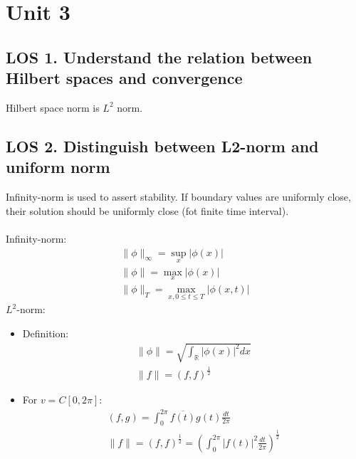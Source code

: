 \documentclass[12pt, a4paper]{article}
\begin{document}
\section*{Unit 3}
\vspace{1em}

\subsection*{LOS 1. Understand the relation between Hilbert spaces and convergence}
Hilbert space norm is $L^2$ norm. \\
\vspace{0.3em}

\subsection*{LOS 2. Distinguish between L2-norm and uniform norm}
Infinity-norm is used to assert stability. If boundary values are uniformly close, their solution should be uniformly close (fot finite time interval).\\\\
Infinity-norm:
\begin{gather*}
    \|\phi\|_{\infty}  = \sup_x|\phi(x)|\\
    \|\phi\| = \max_{x}|\phi(x)|\\
    \|\phi\|_T = \max_{x, 0\leq t\leq T}|\phi(x, t)|
\end{gather*}
$L^2$-norm:
\begin{itemize}
    \item Definition:
    \begin{gather*}
        \|\phi\| = \sqrt{\int_{\mathbb{R}}|\phi(x)|^2dx}\\
        \|f\| = (f, f)^\frac{1}{2}
    \end{gather*}
    \item For $v=C[0,2\pi]$:
    \begin{gather*}
        (f, g) = \int_0^{2\pi}\overline{f(t)}g(t)\frac{dt}{2\pi}\\
        \|f\| = (f, f)^\frac{1}{2} = \left(\int_0^{2\pi}|{f(t)}|^2\frac{dt}{2\pi}\right)^\frac{1}{2} \\
    \end{gather*}
\end{itemize}
\vspace{0.3em}
\end{document}
